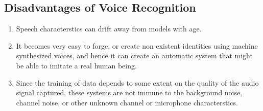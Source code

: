 \subsection{Disadvantages of Voice Recognition}

\begin{enumerate}
  \item Speech characterstics can drift away from models with age.
  \item It becomes very easy to forge, or create non existent identities using machine synthesized voices, and  hence it can create an automatic system that might be able to imitate a real human being.
\item Since the training of data depends to some extent on the quality of the audio signal captured, these systems are not immune to the background noise, channel noise, or other unknown  channel or microphone characterstics.
\end{enumerate}
